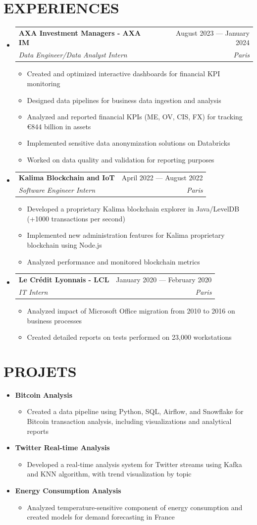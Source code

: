 \documentclass[11pt,a4paper]{article}
\makeatletter
\newcommand{\resumeItem}[1]{
  \item\footnotesize{
    {#1 \vspace{-1pt}}
  }
}
\newcommand{\resumeSubheading}[4]{
  \vspace{2pt}\item
    \begin{tabular*}{\textwidth}[t]{l@{\extracolsep{\fill}}r}
      {\footnotesize\textbf{#1}} & {\footnotesize#2} \\
      {\footnotesize\textit{#3}} & {\footnotesize\textit{#4}} \\
    \end{tabular*}\vspace{2pt}
}
\newcommand{\resumeProjectHeading}[2]{
  \item
  {\footnotesize#1} \hfill {#2}
}
\newcommand{\resumeSubHeadingListStart}{\begin{itemize}[leftmargin=0in, label={}]}
\newcommand{\resumeSubHeadingListEnd}{\end{itemize}}
\newcommand{\resumeItemListStart}{\begin{itemize}[label={\textbullet}]}
\newcommand{\resumeItemListEnd}{\end{itemize}\vspace{0pt}}
\makeatother
\begin{document}
\section{EXPERIENCES}
\resumeSubHeadingListStart
    \resumeSubheading
      {AXA Investment Managers - AXA IM}{August 2023 --- January 2024}
      {Data Engineer/Data Analyst Intern}{Paris}
      \resumeItemListStart
        \resumeItem{Created and optimized interactive dashboards for financial KPI monitoring}
        \resumeItem{Designed data pipelines for business data ingestion and analysis}
        \resumeItem{Analyzed and reported financial KPIs (ME, OV, CIS, FX) for tracking €844 billion in assets}
        \resumeItem{Implemented sensitive data anonymization solutions on Databricks}
        \resumeItem{Worked on data quality and validation for reporting purposes}
      \resumeItemListEnd
    \resumeSubheading
      {Kalima Blockchain and IoT}{April 2022 --- August 2022}
      {Software Engineer Intern}{Paris}
      \resumeItemListStart
        \resumeItem{Developed a proprietary Kalima blockchain explorer in Java/LevelDB (+1000 transactions per second)}
        \resumeItem{Implemented new administration features for Kalima proprietary blockchain using Node.js}
        \resumeItem{Analyzed performance and monitored blockchain metrics}
      \resumeItemListEnd
    \resumeSubheading
      {Le Crédit Lyonnais - LCL}{January 2020 --- February 2020}
      {IT Intern}{Paris}
      \resumeItemListStart
        \resumeItem{Analyzed impact of Microsoft Office migration from 2010 to 2016 on business processes}
        \resumeItem{Created detailed reports on tests performed on 23,000 workstations}
      \resumeItemListEnd
  \resumeSubHeadingListEnd

\section{PROJETS}
\resumeSubHeadingListStart
    \resumeProjectHeading
      {\textbf{Bitcoin Analysis}} {}
      \resumeItemListStart
        \resumeItem{Created a data pipeline using Python, SQL, Airflow, and Snowflake for Bitcoin transaction analysis, including visualizations and analytical reports}
      \resumeItemListEnd
    \resumeProjectHeading
      {\textbf{Twitter Real-time Analysis}} {}
      \resumeItemListStart
        \resumeItem{Developed a real-time analysis system for Twitter streams using Kafka and KNN algorithm, with trend visualization by topic}
      \resumeItemListEnd
    \resumeProjectHeading
      {\textbf{Energy Consumption Analysis \@Capgemini}} {}
      \resumeItemListStart
        \resumeItem{Analyzed temperature-sensitive component of energy consumption and created models for demand forecasting in France}
      \resumeItemListEnd
\resumeSubHeadingListEnd
\end{document}

